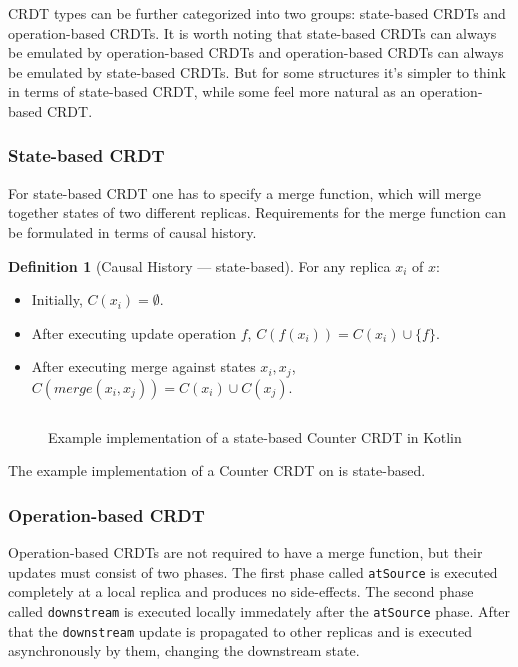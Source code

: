 \documentclass[a4paper, 11pt, oneside]{article}
\theoremstyle{definition}
\newtheorem{definition}{Definition}[section]
\begin{document}
CRDT types can be further categorized into two groups:  state-based CRDTs and operation-based CRDTs. It is worth noting that state-based CRDTs can always be emulated by operation-based CRDTs and operation-based CRDTs can always be emulated by state-based CRDTs. But for some structures it's simpler to think in terms of state-based CRDT, while some feel more natural as an operation-based CRDT.

\subsubsection{State-based CRDT}
For state-based CRDT one has to specify a merge function, which will merge together states of two different replicas. Requirements for the merge function can be formulated in terms of causal history.

\begin{definition}[Causal History — state-based]
    For any replica $x_i$ of $x$:
\begin{itemize}
    \item Initially, $C(x_i) = \emptyset$.
    \item After executing update operation $f$, $C(f(x_i)) = C(x_i) \cup \{f\}$.
    \item After executing merge against states $x_i, x_j$, $C(merge(x_i, x_j)) = C(x_i) \cup C(x_j)$.
\end{itemize}
\end{definition}

\begin{figure}
    \inputminted[frame=single,linenos]{kotlin}{lst/state-counter.kt}
    \caption{Example implementation of a state-based Counter CRDT in Kotlin}
    \label{fig:state-counter}
\end{figure}

The example implementation of a Counter CRDT on  is state-based.

\subsubsection{Operation-based CRDT}

Operation-based CRDTs are not required to have a merge function, but their updates must consist of two phases. The first phase called \verb|atSource| is executed completely at a local replica and produces no side-effects. The second phase called \verb|downstream| is executed locally immedately after the \verb|atSource| phase. After that the \verb|downstream| update is propagated to other replicas and is executed asynchronously by them, changing the downstream state.
\end{document}

